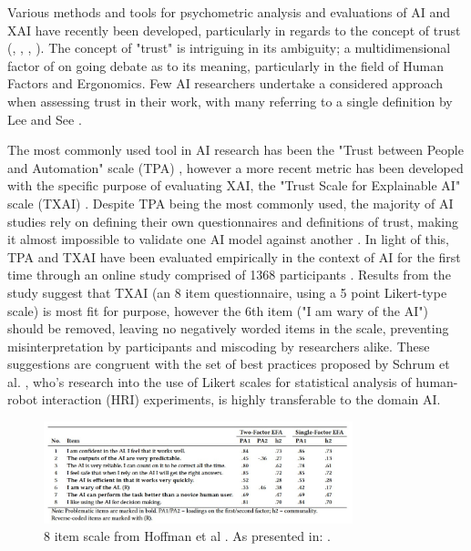 Various methods and tools for psychometric analysis and evaluations of AI and XAI have recently been developed, particularly in regards to the concept of trust (\cite{hoffmanMeasuresExplainableAI2023}, \cite{kleinMinimumNecessaryRigor2023}, \cite{hoffmanEvaluatingMachinegeneratedExplanations2023}, \cite{perrigTrustIssuesTrust2023}). The concept of "trust" is intriguing in its ambiguity; a multidimensional factor of on going debate as to its meaning, particularly in the field of Human Factors and Ergonomics. Few AI researchers undertake a considered approach when assessing trust in their work, with many referring to a single definition by Lee and See \cite{leeTrustAutomationDesigning2004a} \cite{uenoTrustHumanAIInteraction2022}.

The most commonly used tool in AI research has been the "Trust between People and Automation" scale (TPA) \cite{jianFoundationsEmpiricallyDetermined2000}, however a more recent metric has been developed with the specific purpose of evaluating XAI, the "Trust Scale for Explainable AI" scale (TXAI) \cite{hoffmanMeasuresExplainableAI2023}. Despite TPA being the most commonly used, the majority of AI studies rely on defining their own questionnaires and definitions of trust, making it almost impossible to validate one AI model against another \cite{uenoTrustHumanAIInteraction2022}. In light of this, TPA and TXAI have been evaluated empirically in the context of AI for the first time through an online study comprised of 1368 participants \cite{perrigTrustIssuesTrust2023}. Results from the study suggest that TXAI (an 8 item questionnaire, using a 5 point Likert-type scale) is most fit for purpose, however the 6th item ("I am wary of the AI") should be removed, leaving no negatively worded items in the scale, preventing misinterpretation by participants and miscoding by researchers alike. These suggestions are congruent with the set of best practices proposed by Schrum et al. \cite{schrumConcerningTrendsLikert2023}, who's research into the use of Likert scales for statistical analysis of human-robot interaction (HRI) experiments, is highly transferable to the domain AI. 

\begin{figure}[H]
  \centering
    \includegraphics[width=0.8\textwidth]{images/Taken from Perrig et al - Trust tissues with trust scales - review of TXAI by Hofman - 2023.jpg}
  \caption{8 item scale from Hoffman et al \cite{hoffmanMeasuresExplainableAI2023}. As presented in: \cite{perrigTrustIssuesTrust2023}.}\label{fig:CorrectingTXAI}
\end{figure}


